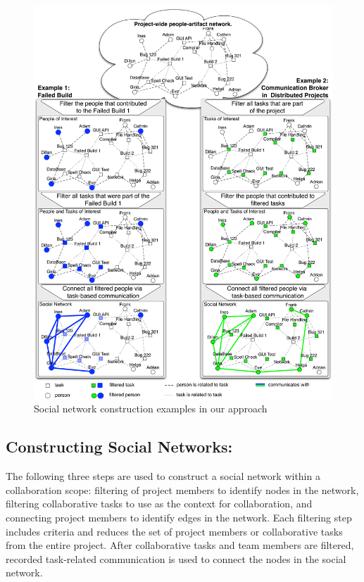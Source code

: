 \documentclass[12pt,oneside]{book}
\newcommand{\cu}{collaborative task}
\newcommand{\people}{project member}
\begin{document}
\begin{figure}[t!]
\begin{center}
\includegraphics[height=0.9465\textheight]{./figures/grand_figure}
\caption{Social network construction examples in our approach}
\label{fig:network}
\end{center}
\end{figure}

\subsection{Constructing Social Networks:}
The following three steps are used to construct a social network within a
collaboration scope: filtering of project members to identify nodes in the
network, filtering collaborative tasks to use as the context for collaboration,
and connecting project members to identify edges in the network. Each filtering
step includes criteria and reduces the set of \people s or \cu s from the entire
project. After collaborative tasks and team members are filtered, recorded
task-related communication is used to connect the nodes in the social network.
\end{document}
